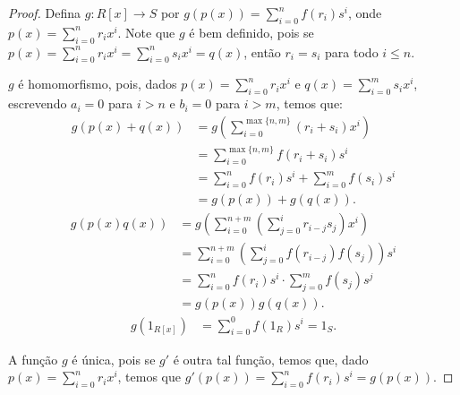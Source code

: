 \begin{proof}
    Defina $g:R[x]\rightarrow S$ por $g(p(x))=\sum_{i=0}^n f(r_i)s^i$, onde $p(x)=\sum_{i=0}^n r_ix^i$.
    Note que $g$ é bem definido, pois se $p(x)=\sum_{i=0}^n r_ix^i=\sum_{i=0}^n s_ix^i=q(x)$, então $r_i=s_i$ para todo $i\leq n$.

    $g$ é homomorfismo, pois, dados $p(x)=\sum_{i=0}^n r_ix^i$ e $q(x)=\sum_{i=0}^m s_ix^i$, escrevendo $a_i=0$ para $i>n$ e $b_i=0$ para $i>m$, temos que:
    \begin{align*}
        g(p(x)+q(x))&=g\left(\sum_{i=0}^{\max\{n, m\}}(r_i+s_i)x^i\right)\\
        &=\sum_{i=0}^{\max\{n, m\}}f(r_i+s_i)s^i\\
        &=\sum_{i=0}^{n}f(r_i)s^i+\sum_{i=0}^{m}f(s_i)s^i\\
        &=g(p(x))+g(q(x)).
    \end{align*}
    \begin{align*}
        g(p(x)q(x))&=g\left(\sum_{i=0}^{n+m}\left(\sum_{j=0}^i r_{i-j}s_j\right)x^i\right)\\
        &=\sum_{i=0}^{n+m}\left(\sum_{j=0}^i f(r_{i-j})f(s_j)\right)s^i\\
        &=\sum_{i=0}^{n}f(r_i)s^i\cdot \sum_{j=0}^m f(s_j)s^j\\
        &=g(p(x))g(q(x)).
    \end{align*}
    \begin{align*}
        g(1_{R[x]})
        &=\sum_{i=0}^0 f(1_R)s^i=1_S.
    \end{align*}

    A função $g$ é única, pois se $g'$ é outra tal função, temos que, dado $p(x)=\sum_{i=0}^n r_ix^i$, temos que $g'(p(x))=\sum_{i=0}^nf(r_i)s^i=g(p(x))$.
\end{proof}